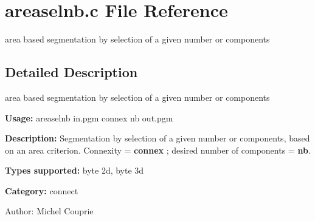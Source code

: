 \section{areaselnb.c File Reference}
\label{areaselnb_8c}
area based segmentation by selection of a given number or components  




\label{_details}
\subsection{Detailed Description}
area based segmentation by selection of a given number or components 

{\bf Usage:} areaselnb in.pgm connex nb out.pgm

{\bf Description:} Segmentation by selection of a given number or components, based on an area criterion. Connexity = {\bf connex} ; desired number of components = {\bf nb}.

{\bf Types supported:} byte 2d, byte 3d

{\bf Category:} connect

\begin{Desc}
\item[Author:]Michel Couprie \end{Desc}
